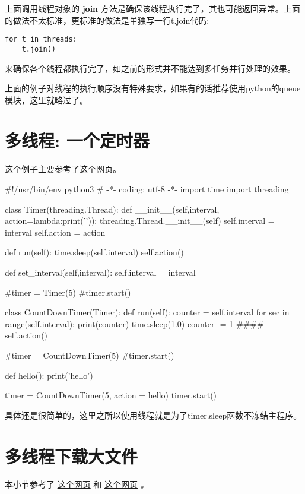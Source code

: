 \documentclass[12pt,oneside]{book}
\begin{document}
\begin{common-format}
上面调用线程对象的 \textbf{join} 方法是确保该线程执行完了，其也可能返回异常。上面的做法不太标准，更标准的做法是单独写一行t.join代码: 

\begin{Verbatim}
for t in threads:
    t.join()
\end{Verbatim}
来确保各个线程都执行完了，如之前的形式并不能达到多任务并行处理的效果。

上面的例子对线程的执行顺序没有特殊要求，如果有的话推荐使用python的queue模块，这里就略过了。


\section{多线程: 一个定时器}
这个例子主要参考了\href{https://mail.python.org/pipermail/tutor/2004-November/033333.html}{这个网页}。

\begin{tcbpython}[]
#!/usr/bin/env python3
# -*- coding: utf-8 -*-
import time
import threading

class Timer(threading.Thread):
    def __init__(self,interval, action=lambda:print('\a')):
        threading.Thread.__init__(self)
        self.interval = interval
        self.action = action

    def run(self):
        time.sleep(self.interval)
        self.action()

    def set_interval(self,interval):
        self.interval = interval

#timer = Timer(5)
#timer.start()

class CountDownTimer(Timer):
    def run(self):
        counter = self.interval
        for sec in range(self.interval):
            print(counter)
            time.sleep(1.0)
            counter -= 1
        ####
        self.action()

#timer = CountDownTimer(5)
#timer.start()

def hello():
    print('hello\a')

timer = CountDownTimer(5, action = hello)
timer.start()
\end{tcbpython}

具体还是很简单的，这里之所以使用线程就是为了timer.sleep函数不冻结主程序。


\section{多线程下载大文件}
本小节参考了 \href{http://stackoverflow.com/questions/13973188/requests-with-multiple-connections}{这个网页} 和 \href{http://stackoverflow.com/questions/16694907/how-to-download-large-file-in-python-with-requests-py}{这个网页} 。


\end{common-format}
\end{document}
